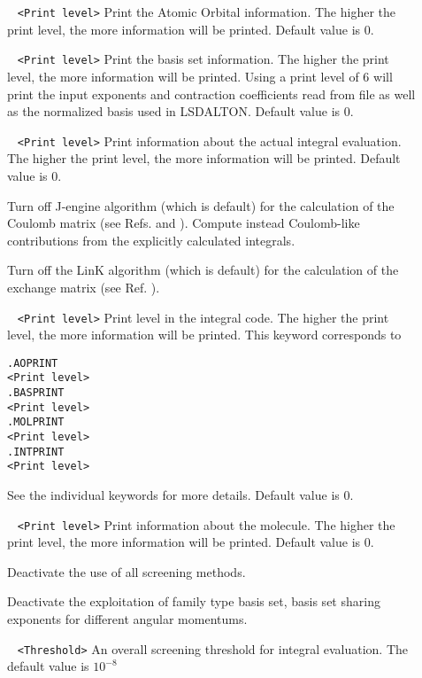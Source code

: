 \begin{description}
\item[] 
\verb| | \newline
\verb|<Print level>|\newline
Print the Atomic Orbital information. The higher the print level, the more information will be printed. Default value is 0.
\item[] 
\verb| | \newline
\verb|<Print level>|\newline
Print the basis set information. The higher the print level, the more information will be printed.
Using a print level of 6 will print the input exponents and contraction coefficients read from file as well as the normalized basis used in LSDALTON. Default value is 0. 
\item[] 
\verb| | \newline
\verb|<Print level>|\newline
Print information about the actual integral evaluation. The higher the print level, the more information will be printed. Default value is 0.
\item[] Turn off J-engine algorithm (which is default) for the calculation of the Coulomb matrix 
(see Refs. \cite{shao:425} and \cite{shao:6572}). Compute instead Coulomb-like contributions from the explicitly calculated integrals.
\item[] Turn off the LinK algorithm (which is default) for the calculation of the exchange matrix (see Ref. \cite{ochsenfeld:1663}).
\item[] 
\verb| | \newline
\verb|<Print level>|\newline
Print level in the integral code. The higher the print level, the more information will be printed. This keyword corresponds to 
\begin{verbatim}
.AOPRINT
<Print level>
.BASPRINT
<Print level>
.MOLPRINT
<Print level>
.INTPRINT
<Print level>
\end{verbatim} 
See the individual keywords for more details. Default value is 0.
\item[] 
\verb| | \newline
\verb|<Print level>|\newline
Print information about the molecule. The higher the print level, the more information will be printed. Default value is 0.
\item[] Deactivate the use of all screening methods.
\item[] Deactivate the exploitation of family type basis set, basis set sharing exponents for different angular momentums.  
\item[]
\verb| | \newline
\verb|<Threshold>|\newline
An overall screening threshold for integral evaluation. The default value is $10^{-8}$


\end{description}
